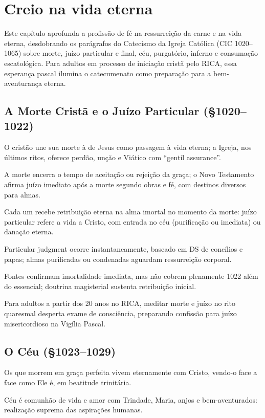 \chapter{Creio na vida eterna}

Este capítulo aprofunda a profissão de fé na ressurreição da carne e na vida eterna, desdobrando os parágrafos do Catecismo da Igreja Católica (CIC 1020--1065) sobre morte, juízo particular e final, céu, purgatório, inferno e consumação escatológica. Para adultos em processo de iniciação cristã pelo RICA, essa esperança pascal ilumina o catecumenato como preparação para a bem-aventurança eterna.

\section{A Morte Cristã e o Juízo Particular (\S 1020--1022)}

O cristão une sua morte à de Jesus como passagem à vida eterna; a Igreja, nos últimos ritos, oferece perdão, unção e Viático com ``gentil assurance''.

A morte encerra o tempo de aceitação ou rejeição da graça; o Novo Testamento afirma juízo imediato após a morte segundo obras e fé, com destinos diversos para almas.

Cada um recebe retribuição eterna na alma imortal no momento da morte: juízo particular refere a vida a Cristo, com entrada no céu (purificação ou imediata) ou danação eterna.

Particular judgment ocorre instantaneamente, baseado em DS de concílios e papas; almas purificadas ou condenadas aguardam ressurreição corporal.

Fontes confirmam imortalidade imediata, mas não cobrem plenamente 1022 além do essencial; doutrina magisterial sustenta retribuição inicial.

Para adultos a partir dos 20 anos no RICA, meditar morte e juízo no rito quaresmal desperta exame de consciência, preparando confissão para juízo misericordioso na Vigília Pascal.

\section{O Céu (\S 1023--1029)}

Os que morrem em graça perfeita vivem eternamente com Cristo, vendo-o face a face como Ele é, em beatitude trinitária.

Céu é comunhão de vida e amor com Trindade, Maria, anjos e bem-aventurados: realização suprema das aspirações humanas.

